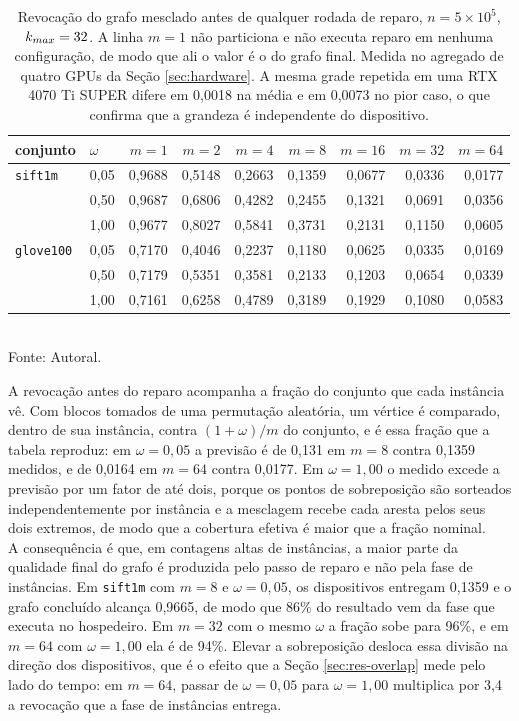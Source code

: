 \begin{table}[htb!]
\caption{\label{tab:premerge} Revocação do grafo mesclado antes de qualquer rodada de reparo, $n = 5 \times 10^5$, $k_{max} = 32$. A linha $m = 1$ não particiona e não executa reparo em nenhuma configuração, de modo que ali o valor é o do grafo final. Medida no agregado de quatro \ac{GPU}s da Seção \ref{sec:hardware}. A mesma grade repetida em uma RTX 4070 Ti SUPER difere em 0,0018 na média e em 0,0073 no pior caso, o que confirma que a grandeza é independente do dispositivo.}
\centering
\footnotesize
\begin{tabular}{@{}llrrrrrrr@{}}
\toprule
conjunto & $\omega$ & $m=1$ & $m=2$ & $m=4$ & $m=8$ & $m=16$ & $m=32$ & $m=64$ \\
\midrule
\texttt{sift1m}
  & 0,05 & 0,9688 & 0,5148 & 0,2663 & 0,1359 & 0,0677 & 0,0336 & 0,0177 \\
  & 0,50 & 0,9687 & 0,6806 & 0,4282 & 0,2455 & 0,1321 & 0,0691 & 0,0356 \\
  & 1,00 & 0,9677 & 0,8027 & 0,5841 & 0,3731 & 0,2131 & 0,1150 & 0,0605 \\
\midrule
\texttt{glove100}
  & 0,05 & 0,7170 & 0,4046 & 0,2237 & 0,1180 & 0,0625 & 0,0335 & 0,0169 \\
  & 0,50 & 0,7179 & 0,5351 & 0,3581 & 0,2133 & 0,1203 & 0,0654 & 0,0339 \\
  & 1,00 & 0,7161 & 0,6258 & 0,4789 & 0,3189 & 0,1929 & 0,1080 & 0,0583 \\
\bottomrule
\end{tabular}\\
Fonte: Autoral.
\end{table}

A revocação antes do reparo acompanha a fração do conjunto que cada instância vê. Com blocos tomados de uma permutação aleatória, um vértice é comparado, dentro de sua instância, contra $(1+\omega)/m$ do conjunto, e é essa fração que a tabela reproduz: em $\omega = 0{,}05$ a previsão é de 0,131 em $m = 8$ contra 0,1359 medidos, e de 0,0164 em $m = 64$ contra 0,0177. Em $\omega = 1{,}00$ o medido excede a previsão por um fator de até dois, porque os pontos de sobreposição são sorteados independentemente por instância e a mesclagem recebe cada aresta pelos seus dois extremos, de modo que a cobertura efetiva é maior que a fração nominal.\\

A consequência é que, em contagens altas de instâncias, a maior parte da qualidade final do grafo é produzida pelo passo de reparo e não pela fase de instâncias. Em \texttt{sift1m} com $m = 8$ e $\omega = 0{,}05$, os dispositivos entregam 0,1359 e o grafo concluído alcança 0,9665, de modo que 86\% do resultado vem da fase que executa no hospedeiro. Em $m = 32$ com o mesmo $\omega$ a fração sobe para 96\%, e em $m = 64$ com $\omega = 1{,}00$ ela é de 94\%. Elevar a sobreposição desloca essa divisão na direção dos dispositivos, que é o efeito que a Seção \ref{sec:res-overlap} mede pelo lado do tempo: em $m = 64$, passar de $\omega = 0{,}05$ para $\omega = 1{,}00$ multiplica por 3,4 a revocação que a fase de instâncias entrega.\\

